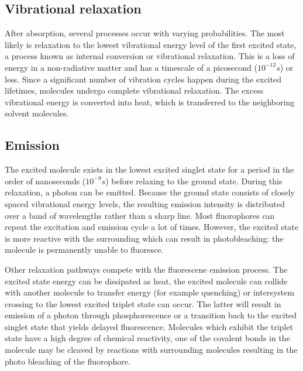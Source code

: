 \documentclass[twoside,single]{lion-msc}
\begin{document}
\subsection{Vibrational relaxation}
After absorption, several processes occur with varying probabilities. The most likely is relaxation to the lowest vibrational energy level of the first excited state, a process known as internal conversion or vibrational relaxation. This is a loss of energy in a non-radiative matter and has a timescale of a picosecond ($10^{-12}s$) or less. Since a significant number of vibration cycles happen during the excited lifetimes, molecules undergo complete vibrational relaxation. The excess vibrational energy is converted into heat, which is transferred to the neighboring solvent molecules.

\subsection{Emission}
The excited molecule exists in the lowest excited singlet state for a period in the order of nanoseconds ($10^{-9}s$) before relaxing to the ground state. During this relaxation, a photon can be emitted. Because the ground state consists of closely spaced vibrational energy levels, the resulting emission intensity is distributed over a band of wavelengths rather than a sharp line. Most fluorophores can repeat the excitation and emission cycle a lot of times. However, the excited state is more reactive with the surrounding which can result in photobleaching: the molecule is permanently unable to fluoresce. 

Other relaxation pathways compete with the fluorescene emission process. The excited state energy can be dissipated as heat, the excited molecule can collide with another molecule to transfer energy (for example quenching) or intersystem crossing to the lowest excited triplet state can occur. The latter will result in emission of a photon through phosphorescence or a transition back to the excited singlet state that yields delayed fluorescence. Molecules which exhibit the triplet state have a high degree of chemical reactivity, one of the covalent bonds in the molecule may be cleaved by reactions with surrounding molecules resulting in the photo bleaching of the fluorophore.
\end{document}
